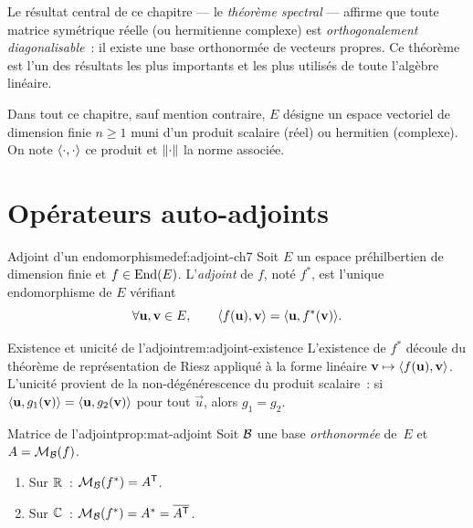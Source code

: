 \medskip

Le résultat central de ce chapitre --- le \emph{théorème spectral} ---
affirme que toute matrice symétrique réelle (ou hermitienne complexe) est
\emph{orthogonalement diagonalisable}~: il existe une base orthonormée de
vecteurs propres. Ce théorème est l'un des résultats les plus importants
et les plus utilisés de toute l'algèbre linéaire.

\medskip

Dans tout ce chapitre, sauf mention contraire, $E$ désigne un espace
vectoriel de dimension finie $n \geq 1$ muni d'un produit scalaire
(réel) ou hermitien (complexe). On note $\langle{\cdot},{\cdot}\rangle$ ce
produit et $\lVert\cdot\rVert$ la norme associée.

\section{Opérateurs auto-adjoints}\label{sec:auto-adjoint}

\begin{definition}{Adjoint d'un endomorphisme}{def:adjoint-ch7}
  Soit $E$ un espace préhilbertien de
  dimension finie et $f \in \operatorname{End}(E)$. L'\emph{adjoint}
  de $f$, noté $f^*$, est l'unique endomorphisme de $E$ vérifiant
  \[
    \forall \mathbf{u}, \mathbf{v} \in E, \qquad
    \langle f(\mathbf{u}), \mathbf{v}\rangle = \langle\mathbf{u}, f^*(\mathbf{v})\rangle.
  \]
\end{definition}

\begin{remark}{Existence et unicité de l'adjoint}{rem:adjoint-existence}
  L'existence de $f^*$ découle du théorème de représentation de Riesz
  appliqué à la forme linéaire $\mathbf{v} \mapsto \langle f(\mathbf{u}), \mathbf{v}\rangle$.
  L'unicité provient de la non-dégénérescence du produit scalaire~: si
  $\langle\mathbf{u}, g_1(\mathbf{v})\rangle = \langle\mathbf{u}, g_2(\mathbf{v})\rangle$ pour
  tout $\vec{u}$, alors $g_1 = g_2$.
\end{remark}

\begin{proposition}{Matrice de l'adjoint}{prop:mat-adjoint}
  Soit ${\mathcal{B}}$ une base \emph{orthonormée} de~$E$ et
  $A = \mathcal{M}_{\mathcal{B}}(f)$.
  \begin{enumerate}[label=(\roman*)]
    \item Sur ${\mathbb{R}}$~: $\mathcal{M}_{\mathcal{B}}(f^*) = {A}^{\mathsf{T}}$.
    \item Sur ${\mathbb{C}}$~: $\mathcal{M}_{\mathcal{B}}(f^*) = {A}^{*} = \overline{{A}^{\mathsf{T}}}$.
  \end{enumerate}
\end{proposition}


